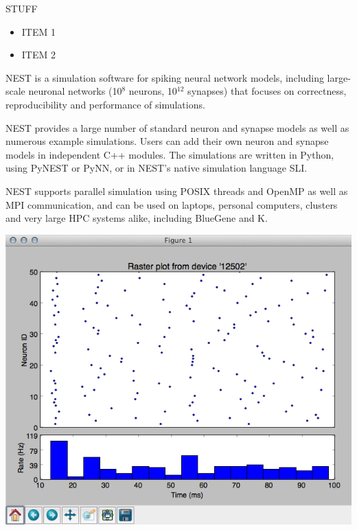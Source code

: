 \begin{multicols}{3}

STUFF

\begin{itemize}[nolistsep,topsep=0em,leftmargin=1pc]
\item ITEM 1
\item ITEM 2
\end{itemize}


NEST is a simulation software for spiking neural network models,
including large-scale neuronal networks (10$^8$ neurons, 10$^{12}$
synapses) that focuses on correctness, reproducibility and performance
of simulations.

NEST provides a large number of standard neuron and synapse models as
well as numerous example simulations. Users can add their own neuron and
synapse models in independent C++ modules. The simulations are written
in Python, using PyNEST or PyNN, or in NEST's native simulation language
SLI.

NEST supports parallel simulation using POSIX threads and OpenMP as well
as MPI communication, and can be used on laptops, personal computers,
clusters and very large HPC systems alike, including BlueGene and K.

\begin{center}
\includegraphics[width=0.9\columnwidth]{../pics/nest_raster.png}
\end{center}


\end{multicols}
